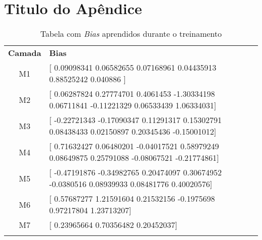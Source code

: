 \chapter{Titulo do Ap\^endice}

\begin{table}
	\center
	\caption{Tabela com \emph{Bias} aprendidos durante o treinamento}
	\renewcommand{\arraystretch}{1.6}
	\begin{tabular}{c p{8.0cm}}
		\Xhline{6\arrayrulewidth}
		\textbf{Camada} &
			\textbf{Bias} \\
		\Xhline{2\arrayrulewidth}
		M1 & [
			0.09098341  0.06582655 0.07168961  0.04435913  0.88525242
			 0.040886  ] \\
		M2 & [
			0.06287824  0.27774701 0.4061453  -1.30334198 0.06711841
			-0.11221329 0.06533439  1.06334031] \\
		M3 & [
			-0.22721343 -0.17090347 0.11291317 0.15302791 0.08438433
			0.02150897 0.20345436 -0.15001012] \\ 
		M4 & [
			0.71632427 0.06480201 -0.04017521 0.58979249 0.08649875
			0.25791088 -0.08067521 -0.21774861] \\
		M5 & [
			-0.47191876 -0.34982765 0.20474097 0.30674952 -0.0380516
			0.08939933 0.08481776 0.40020576] \\
		M6 & [
			0.57687277 1.21591604 0.21532156 -0.1975698 0.97217804
			1.23713207] \\
		M7 & [
			0.23965664 0.70356482 0.20452037] \\
		
		\Xhline{6\arrayrulewidth}
	\end{tabular}
	\label{tbl:player_fps}
\end{table}

